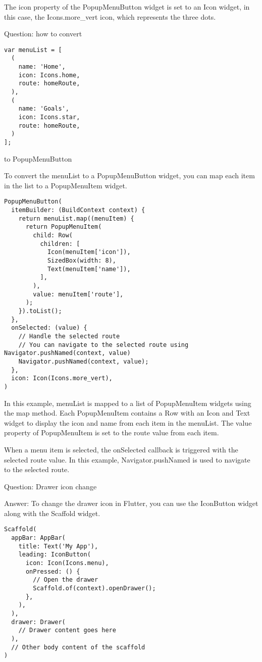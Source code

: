 The icon property of the PopupMenuButton widget is set to an Icon widget, in this case, the Icons.more\_vert 
icon, which represents the three dots.


Question: how to convert
\begin{lstlisting}
var menuList = [
  (
    name: 'Home',
    icon: Icons.home,
    route: homeRoute,
  ),
  (
    name: 'Goals',
    icon: Icons.star,
    route: homeRoute,
  )
];
\end{lstlisting}
to PopupMenuButton

To convert the menuList to a PopupMenuButton widget, you can map each item in the list to a PopupMenuItem widget. 

\begin{lstlisting}
PopupMenuButton(
  itemBuilder: (BuildContext context) {
    return menuList.map((menuItem) {
      return PopupMenuItem(
        child: Row(
          children: [
            Icon(menuItem['icon']),
            SizedBox(width: 8),
            Text(menuItem['name']),
          ],
        ),
        value: menuItem['route'],
      );
    }).toList();
  },
  onSelected: (value) {
    // Handle the selected route
    // You can navigate to the selected route using Navigator.pushNamed(context, value)
    Navigator.pushNamed(context, value);
  },
  icon: Icon(Icons.more_vert),
)
\end{lstlisting}

In this example, menuList is mapped to a list of PopupMenuItem widgets using the map method. Each PopupMenuItem 
contains a Row with an Icon and Text widget to display the icon and name from each item in the menuList. 
The value property of PopupMenuItem is set to the route value from each item.

When a menu item is selected, the onSelected callback is triggered with the selected route value. In this example,
Navigator.pushNamed is used to navigate to the selected route.


Question: Drawer icon change

Answer: To change the drawer icon in Flutter, you can use the IconButton widget along with the Scaffold widget. 

\begin{lstlisting}
Scaffold(
  appBar: AppBar(
    title: Text('My App'),
    leading: IconButton(
      icon: Icon(Icons.menu),
      onPressed: () {
        // Open the drawer
        Scaffold.of(context).openDrawer();
      },
    ),
  ),
  drawer: Drawer(
    // Drawer content goes here
  ),
  // Other body content of the scaffold
)
\end{lstlisting}

